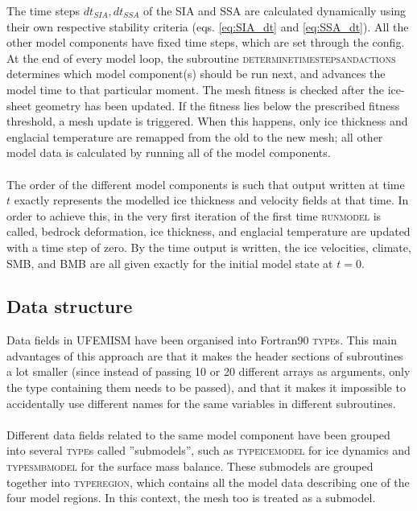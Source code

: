 \documentclass{article}
\begin{document}
The time steps $dt_{SIA}, dt_{SSA}$ of the SIA and SSA are calculated dynamically using their own respective stability criteria (eqs. \eqref{eq:SIA_dt} and \eqref{eq:SSA_dt}). All the other model components have fixed time steps, which are set through the config. At the end of every model loop, the subroutine \textsc{determine\textunderscore timesteps\textunderscore and\textunderscore actions} determines which model component(s) should be run next, and advances the model time to that particular moment. The mesh fitness is checked after the ice-sheet geometry has been updated. If the fitness lies below the prescribed fitness threshold, a mesh update is triggered. When this happens, only ice thickness and englacial temperature are remapped from the old to the new mesh; all other model data is calculated by running all of the model components.\\
\\
The order of the different model components is such that output written at time $t$ exactly represents the modelled ice thickness and velocity fields at that time. In order to achieve this, in the very first iteration of the first time \textsc{run\textunderscore model} is called, bedrock deformation, ice thickness, and englacial temperature are updated with a time step of zero. By the time output is written, the ice velocities, climate, SMB, and BMB are all given exactly for the initial model state at $t=0$.

\subsection{Data structure}

Data fields in UFEMISM have been organised into Fortran90 \textsc{type}s. This main advantages of this approach are that it makes the header sections of subroutines a lot smaller (since instead of passing 10 or 20 different arrays as arguments, only the type containing them needs to be passed), and that it makes it impossible to accidentally use different names for the same variables in different subroutines.\\
\\
Different data fields related to the same model component have been grouped into several \textsc{type}s called ''submodels'', such as \textsc{type\textunderscore ice\textunderscore model} for ice dynamics and \textsc{type\textunderscore smb\textunderscore model} for the surface mass balance. These submodels are grouped together into \textsc{type\textunderscore region}, which contains all the model data describing one of the four model regions. In this context, the mesh too is treated as a submodel.
\end{document}

